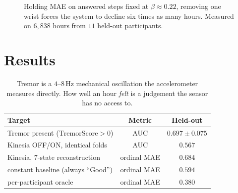\documentclass[11pt,a4paper]{article}
\begin{document}
\begin{figure}[h]
\centering
{}
\caption{Holding MAE on answered steps fixed at $\beta\!\approx\!0.22$, removing
one wrist forces the system to decline six times as many hours. Measured on
$6{,}838$ hours from $11$ held-out participants.}
\end{figure}

\section{Results}

\begin{table}[h]
\centering\small\color{ink}
\begin{tabular}{lcc}
\toprule
\textbf{Target} & \textbf{Metric} & \textbf{Held-out} \\
\midrule
Tremor present ($\mathrm{TremorScore}>0$) & AUC & $\mathbf{0.697 \pm 0.075}$ \\
Kinesia OFF/ON, identical folds           & AUC & $0.567$ \\
Kinesia, 7-state reconstruction           & ordinal MAE & $0.684$ \\
\quad constant baseline (always ``Good'') & ordinal MAE & $\mathbf{0.594}$ \\
\quad per-participant oracle              & ordinal MAE & $0.380$ \\
\bottomrule
\end{tabular}
\caption{Tremor is a $4$--$8\,\mathrm{Hz}$ mechanical oscillation the
accelerometer measures directly. How well an hour \emph{felt} is a judgement
the sensor has no access to.}
\end{table}
\end{document}
